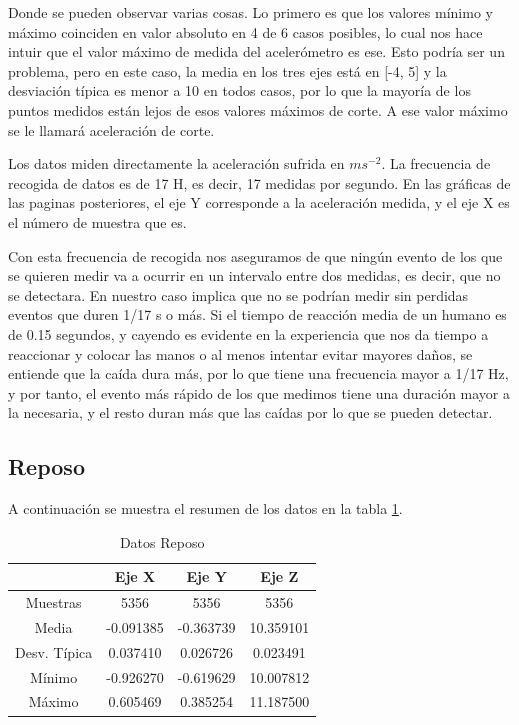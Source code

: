 \documentclass[12pt]{book}
\numberwithin{equation}{section}
\begin{document}
Donde se pueden observar varias cosas. Lo primero es que los valores mínimo y máximo coinciden en valor absoluto en 4 de 6 casos posibles, lo cual nos hace intuir que el valor máximo de medida del acelerómetro es ese. Esto podría ser un problema, pero en este caso, la media en los tres ejes está en [-4, 5] y la desviación típica es menor a 10 en todos casos, por lo que la mayoría de los puntos medidos están lejos de esos valores máximos de corte.  A ese valor máximo se le llamará aceleración de corte.

Los datos miden directamente la aceleración sufrida en $m s^{-2}$. La frecuencia de recogida de datos es de 17 H, es decir, 17 medidas por segundo. En las gráficas de las paginas posteriores, el eje Y corresponde a la aceleración medida, y el eje X es el número de muestra que es.

Con esta frecuencia de recogida nos aseguramos de que ningún evento de los que se quieren medir va a ocurrir en un intervalo entre dos medidas, es decir, que no se detectara. En nuestro caso implica que no se podrían medir sin perdidas eventos que duren 1/17 s o más. Si el tiempo de reacción media de un humano es de 0.15 segundos, y cayendo es evidente en la experiencia que nos da tiempo a reaccionar y colocar las manos o al menos intentar evitar mayores daños, se entiende que la caída dura más, por lo que tiene una frecuencia mayor a 1/17 Hz, y por tanto, el evento más rápido de los que medimos tiene una duración mayor a la necesaria, y el resto duran más que las caídas por lo que se pueden detectar. 

\subsection{Reposo}

A continuación se muestra el resumen de los datos en la tabla \ref{tabla3}.

\begin{table}[h]
\centering
\caption{Datos Reposo}
\begin{tabular}{| c | c | c | c |}
\hline
 & Eje X & Eje Y & Eje Z \\
\hline
Muestras & 5356 & 5356 & 5356 \\
\hline
Media & -0.091385 & -0.363739 & 10.359101 \\
\hline
Desv. Típica & 0.037410 & 0.026726 & 0.023491 \\
\hline
Mínimo & -0.926270 & -0.619629 & 10.007812 \\
\hline
Máximo & 0.605469 & 0.385254 & 11.187500 \\
\hline
\end{tabular}
\label{tabla3}
\end{table}
\end{document}
